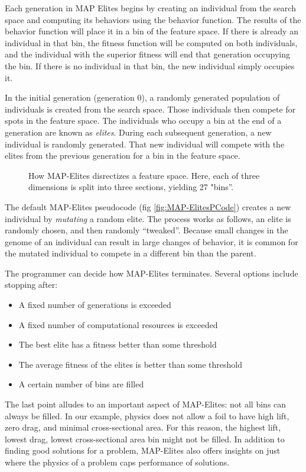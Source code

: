 \documentclass{sig-alternate}
\begin{document}
Each generation in MAP Elites begins by creating an individual from the search space and computing its behaviors using the behavior function.
The results of the behavior function will place it in a bin of the feature space.
If there is already an individual in that bin, the fitness function will be computed on both individuals, and the individual with the superior fitness will end that generation occupying the bin.
If there is no individual in that bin, the new individual simply occupies it.

In the initial generation (generation 0), a randomly generated population of individuals is created from the search space.
Those individuals then compete for spots in the feature space.
The individuals who occupy a bin at the end of a generation are known as \textit{elites}.
During each subsequent generation, a new individual is randomly generated.
That new individual will compete with the elites from the previous generation for a bin in the feature space.

\begin{figure}[tb]
\centering
{}
\caption{How MAP-Elites disrectizes a feature space. Here, each of three dimensions is split into three sections, yielding 27 "bins''.}
\label{fig:FeatureSpace}
\end{figure}

The default MAP-Elites pseudocode (fig \ref{fig:MAP-ElitesPCode}) creates a new individual by \textit{mutating} a random elite.
The process works as follows, an elite is randomly chosen, and then randomly ``tweaked''. 
Because small changes in the genome of an individual can result in large changes of behavior, it is common for the mutated individual to compete in a different bin than the parent.

The programmer can decide how MAP-Elites terminates.
Several options include stopping after:
\begin{itemize}
  \item A fixed number of generations is exceeded
  \item A fixed number of computational resources is exceeded
  \item The best elite has a fitness better than some threshold
  \item The average fitness of the elites is better than some threshold
  \item A certain number of bins are filled
\end{itemize}
The last point alludes to an important aspect of MAP-Elites: not all bins can always be filled.
In our example, physics does not allow a foil to have high lift, zero drag, and minimal cross-sectional area.
For this reason, the highest lift, lowest drag, lowest cross-sectional area bin might not be filled.
In addition to finding good solutions for a problem, MAP-Elites also offers insights on just where the physics of a problem caps performance of solutions.
\end{document}
